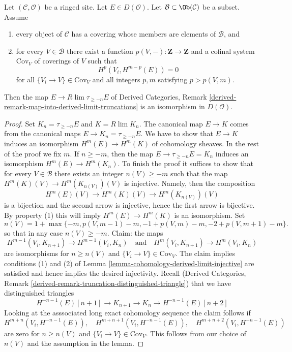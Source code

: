 \begin{lemma}
\label{lemma-is-limit-per-object}
Let $(\mathcal{C}, \mathcal{O})$ be a ringed site. Let $E \in D(\mathcal{O})$.
Let $\mathcal{B} \subset \Ob(\mathcal{C})$ be a subset. Assume
\begin{enumerate}
\item every object of $\mathcal{C}$ has a covering whose members
are elements of $\mathcal{B}$, and
\item for every $V \in \mathcal{B}$ there exist a function
$p(V, -) : \mathbf{Z} \to \mathbf{Z}$ and a cofinal system $\text{Cov}_V$
of coverings of $V$ such that
$$
H^p(V_i, H^{m - p}(E)) = 0
$$
for all $\{V_i \to V\} \in \text{Cov}_V$ and all integers $p, m$
satisfying $p > p(V, m)$.
\end{enumerate}
Then the map $E \to R\lim \tau_{\geq -n} E$ of
Derived Categories, Remark
\ref{derived-remark-map-into-derived-limit-truncations}
is an isomorphism in $D(\mathcal{O})$.
\end{lemma}

\begin{proof}
Set $K_n = \tau_{\geq -n}E$ and $K = R\lim K_n$.
The canonical map $E \to K$
comes from the canonical maps $E \to K_n = \tau_{\geq -n}E$.
We have to show that $E \to K$ induces an isomorphism
$H^m(E) \to H^m(K)$ of cohomology sheaves. In the rest of the
proof we fix $m$. If $n \geq -m$, then
the map $E \to \tau_{\geq -n}E = K_n$ induces an isomorphism
$H^m(E) \to H^m(K_n)$.
To finish the proof it suffices to show that for every $V \in \mathcal{B}$
there exists an integer $n(V) \geq -m$ such that the map
$H^m(K)(V) \to H^m(K_{n(V)})(V)$ is injective. Namely, then
the composition
$$
H^m(E)(V) \to H^m(K)(V) \to H^m(K_{n(V)})(V)
$$
is a bijection and the second arrow is injective, hence the
first arrow is bijective. By property (1) this will imply
$H^m(E) \to H^m(K)$ is an isomorphism. Set
$$
n(V) = 1 + \max\{-m, p(V, m - 1) - m, -1 + p(V, m) - m, -2 + p(V, m + 1) - m\}.
$$
so that in any case $n(V) \geq -m$. Claim: the maps
$$
H^{m - 1}(V_i, K_{n + 1}) \to H^{m - 1}(V_i, K_n)
\quad\text{and}\quad
H^m(V_i, K_{n + 1}) \to H^m(V_i, K_n)
$$
are isomorphisms for $n \geq n(V)$ and $\{V_i \to V\} \in \text{Cov}_V$.
The claim implies conditions
(1) and (2) of Lemma \ref{lemma-cohomology-derived-limit-injective}
are satisfied and hence implies the desired injectivity.
Recall (Derived Categories, Remark
\ref{derived-remark-truncation-distinguished-triangle})
that we have distinguished triangles
$$
H^{-n - 1}(E)[n + 1] \to
K_{n + 1} \to K_n \to H^{-n - 1}(E)[n + 2]
$$
Looking at the asssociated long exact cohomology sequence the claim follows if
$$
H^{m + n}(V_i, H^{-n - 1}(E)),\quad
H^{m + n + 1}(V_i, H^{-n - 1}(E)),\quad
H^{m + n + 2}(V_i, H^{-n - 1}(E))
$$
are zero for $n \geq n(V)$ and $\{V_i \to V\} \in \text{Cov}_V$.
This follows from our choice of $n(V)$
and the assumption in the lemma.
\end{proof}

